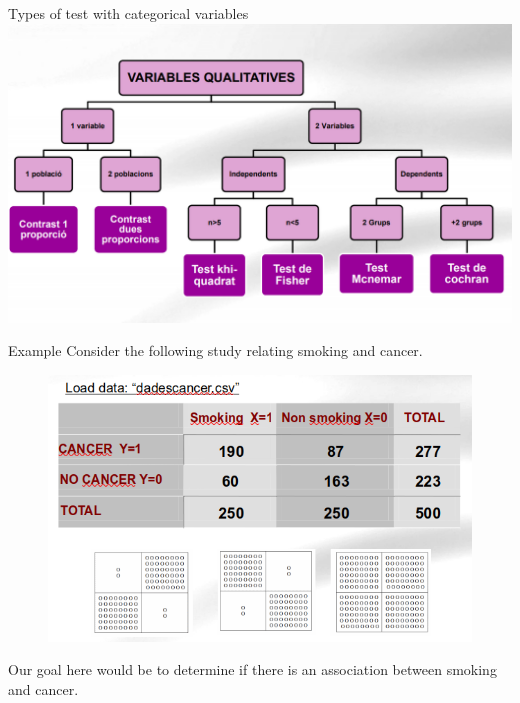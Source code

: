 \documentclass[
  ignorenonframetext,
]{beamer}
\begin{document}
\begin{frame}{Types of test with categorical variables}
\protect\hypertarget{types-of-test-with-categorical-variables-1}{}
\includegraphics{images/arbrequali.PNG}
\end{frame}

\begin{frame}{Example}
\protect\hypertarget{example}{}
Consider the following study relating smoking and cancer.

\begin{figure}
\includegraphics[width=0.8\linewidth]{images/cancerAndSmoking1png} \end{figure}

Our goal here would be to determine if there is an association between
smoking and cancer.
\end{frame}
\end{document}
